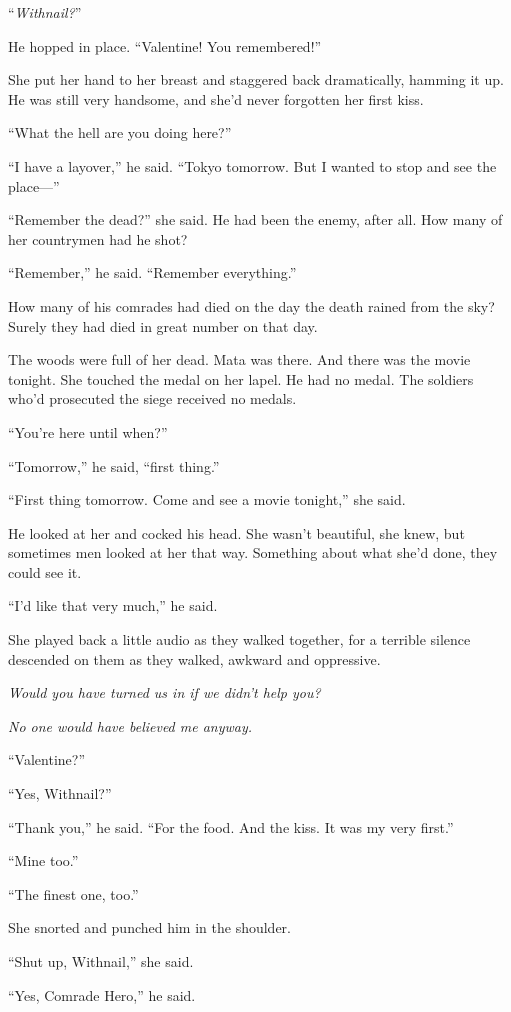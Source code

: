 “\emph{Withnail?}”

He hopped in place. “Valentine! You remembered!”

She put her hand to her breast and staggered back dramatically,
hamming it up. He was still very handsome, and she’d never
forgotten her first kiss.

“What the hell are you doing here?”

“I have a layover,” he said. “Tokyo tomorrow. But I wanted to stop
and see the place—”

“Remember the dead?” she said. He had been the enemy, after all.
How many of her countrymen had he shot?

“Remember,” he said. “Remember everything.”

How many of his comrades had died on the day the death rained from
the sky? Surely they had died in great number on that day.

The woods were full of her dead. Mata was there. And there was the
movie tonight. She touched the medal on her lapel. He had no medal.
The soldiers who’d prosecuted the siege received no medals.

“You’re here until when?”

“Tomorrow,” he said, “first thing.”

“First thing tomorrow. Come and see a movie tonight,” she said.

He looked at her and cocked his head. She wasn’t beautiful, she
knew, but sometimes men looked at her that way. Something about
what she’d done, they could see it.

“I’d like that very much,” he said.

She played back a little audio as they walked together, for a
terrible silence descended on them as they walked, awkward and
oppressive.

\emph{Would you have turned us in if we didn’t help you?}

\emph{No one would have believed me anyway.}

“Valentine?”

“Yes, Withnail?”

“Thank you,” he said. “For the food. And the kiss. It was my very
first.”

“Mine too.”

“The finest one, too.”

She snorted and punched him in the shoulder.

“Shut up, Withnail,” she said.

“Yes, Comrade Hero,” he said.

